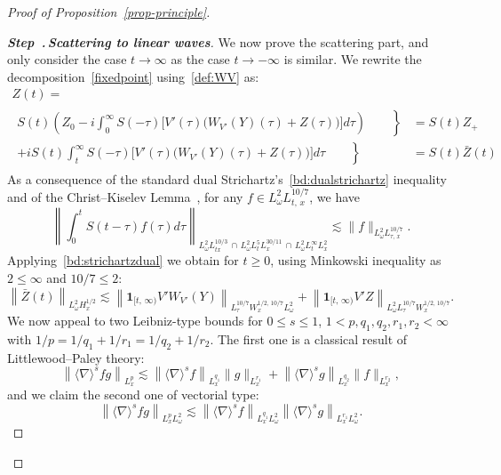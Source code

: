 \documentclass[10pt]{amsart}
\theoremstyle{definition}\newtheorem{defi}[theo]{Definition}\newtheorem{rema}[theo]{Remark}\newtheorem{exam}[theo]{Example}\newtheorem{exem}[theo]{Example}\newtheorem{nota}[theo]{Notation}
\newcommand{\bfun}{\mathbf{1}}
\newcounter{stepcount}
\newenvironment{step}[1]{\refstepcounter{stepcount}\begin{proof}[{\bf{Step~\thestepcount}{.\,\emph{#1}}}]}{\let\qed\relax\end{proof}}
\begin{document}
\begin{proof}[Proof of Proposition~\ref{prop-principle}]
\begin{step}{{Scattering to linear waves}}\label{proofpro3.1step2}
We now prove the scattering part, and only consider the case $t\rightarrow \infty$ as the case $t\rightarrow -\infty$ is similar. We rewrite the decomposition~\eqref{fixedpoint} using~\eqref{def:WV} as:
\begin{multline} \label{def:Z+}
Z(t)=\\
\begin{aligned}
\left. S(t)\left(Z_0 -i \int_{0}^\infty S(-\tau) \Big[V'(\tau) \big(W_{V'}(Y)(\tau) +Z(\tau)\big) \Big] d\tau \right)\qquad \right\}&=S(t)Z_+\\
\left. +iS(t) \int_{t}^\infty S(- \tau) \Big[V'(\tau) \big(W_{V'}(Y)(\tau) +Z(\tau)\big) \Big] d\tau \qquad \right\}&=S(t)\bar Z(t)
\end{aligned}
\end{multline}
As a consequence of the standard dual Strichartz's~\eqref{bd:dualstrichartz} inequality and of the Christ--Kiselev Lemma~\cite{ChKi}, for any $f\in L^2_\omega L^{10/7}_{t,\,x}$, we have
\begin{equation} \label{bd:strichartzdual}
\left\| \int_0^t S(t-\tau)f(\tau)d\tau \right\|_{L^2_\omega L^{10/3}_{tx}\,\cap\,L^2_\omega L^{5}_tL^{30/11}_x\,\cap\,L^2_\omega L^{\infty}_t L^2_x }\lesssim \| f \|_{ L^2_\omega L^{10/7}_{\tau,\,x}}.
\end{equation}
Applying~\eqref{bd:strichartzdual} we obtain for $t\geq 0$, using Minkowski inequality as $2\leq \infty$ and $10/7\leq 2$:
\[
\left\| \bar Z(t)\right\|_{L^2_\omega H^{1/2}_x} \lesssim \left\|\bfun_{[t,\,\infty)}V' W_{V'}(Y)\right\|_{L^{10/7}_\tau W^{1/2,\,10/7}_x L^2_\omega}+\left\| \bfun_{[t,\,\infty)}V' Z\right\|_{L^2_\omega L^{10/7}_\tau W^{1/2,\,10/7}_x}.
\]
We now appeal to two Leibniz-type bounds for $0\leq s \leq 1$, $1<p,q_1,q_2,r_1,r_2<\infty$ with $1/p=1/q_1+1/r_1=1/q_2+1/r_2$. The first one is a classical result of Littlewood--Paley theory:
\begin{equation} \label{bd:fractionalleibniz1}
\left\| \langle \nabla \rangle^{s}fg \right\|_{L^p_x}\lesssim \left\| \langle \nabla \rangle^{s} f\right\|_{L^{q_1}_x}\| g\|_{L^{r_1}_x}+\left\| \langle \nabla \rangle^{s} g\right\|_{L^{q_2}_x}\| f\|_{L^{r_2}_x},
\end{equation}
and we claim the second one of vectorial type:
\begin{equation} \label{bd:fractionalleibniz2}
\left\| \langle \nabla \rangle^{s}fg \right\|_{L^p_x L^2_\omega}\lesssim \left\| \langle \nabla \rangle^{s} f\right\|_{L^{q_1}_xL^2_\omega}\left\| \langle \nabla \rangle^{s} g\right\|_{L^{r_1}_x L^2_\omega}.

\end{equation}
\end{step}
\end{proof}
\end{document}
